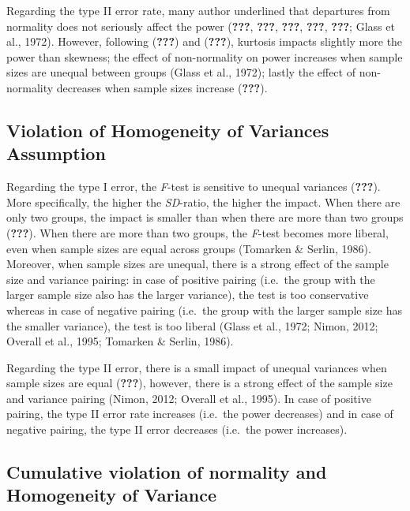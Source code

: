 \documentclass[man,floatsintext]{apa6}
\begin{document}
Regarding the type II error rate, many author underlined that departures
from normality does not seriously affect the power ({\textbf{???}},
{\textbf{???}}, {\textbf{???}}, {\textbf{???}}, {\textbf{???}}; Glass et
al., 1972). However, following ({\textbf{???}}) and ({\textbf{???}}),
kurtosis impacts slightly more the power than skewness; the effect of
non-normality on power increases when sample sizes are unequal between
groups (Glass et al., 1972); lastly the effect of non-normality
decreases when sample sizes increase ({\textbf{???}}).

\subsection{Violation of Homogeneity of Variances
Assumption}\label{violation-of-homogeneity-of-variances-assumption}

Regarding the type I error, the \emph{F}-test is sensitive to unequal
variances ({\textbf{???}}). More specifically, the higher the
\emph{SD}-ratio, the higher the impact. When there are only two groups,
the impact is smaller than when there are more than two groups
({\textbf{???}}). When there are more than two groups, the \emph{F}-test
becomes more liberal, even when sample sizes are equal across groups
(Tomarken \& Serlin, 1986). Moreover, when sample sizes are unequal,
there is a strong effect of the sample size and variance pairing: in
case of positive pairing (i.e.~the group with the larger sample size
also has the larger variance), the test is too conservative whereas in
case of negative pairing (i.e.~the group with the larger sample size has
the smaller variance), the test is too liberal (Glass et al., 1972;
Nimon, 2012; Overall et al., 1995; Tomarken \& Serlin, 1986).

Regarding the type II error, there is a small impact of unequal
variances when sample sizes are equal ({\textbf{???}}), however, there
is a strong effect of the sample size and variance pairing (Nimon, 2012;
Overall et al., 1995). In case of positive pairing, the type II error
rate increases (i.e.~the power decreases) and in case of negative
pairing, the type II error decreases (i.e.~the power increases).

\subsection{Cumulative violation of normality and Homogeneity of
Variance}\label{cumulative-violation-of-normality-and-homogeneity-of-variance}
\end{document}
